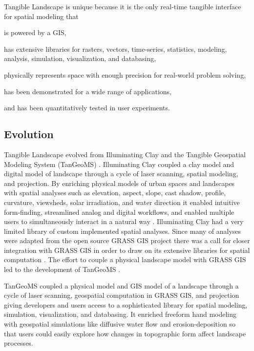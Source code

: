 \documentclass[prodmode,acmtochi]{acmsmall} %
\begin{document}
Tangible Landscape is unique because it is the only 
real-time tangible interface for spatial modeling that 
\begin{enumerate*}
\item is powered by a GIS,
\item has extensive libraries for rasters, vectors, time-series, statistics, modeling, analysis, simulation, visualization, and databasing, 
\item physically represents space with enough precision for real-world problem solving,
\item has been demonstrated for a wide range of applications,
\item and has been quantitatively tested in user experiments. 
\end{enumerate*}

\subsection{Evolution}
Tangible Landscape evolved from 
Illuminating Clay \cite{Piper2002a} and 
the Tangible Geospatial Modeling System (TanGeoMS) \cite{Tateosian2010}. 
Illuminating Clay coupled a clay model and digital model of landscape 
through a cycle of laser scanning, spatial modeling, and projection.
By enriching physical models of urban spaces and landscapes 
with spatial analyses  
such as 
elevation, aspect, slope, cast shadow, profile, curvature, 
viewsheds, solar irradiation, and water direction
it enabled
intuitive form-finding, 
streamlined analog and digital workflows, 
and enabled multiple users to simultaneously interact in a natural way \cite{Ratti2004}. 
Illuminating Clay had a very limited library of custom implemented spatial analyses. 
Since many of analyses were adapted 
from the open source GRASS GIS project \cite{Piper2002a} 
there was a call for closer integration with GRASS GIS 
in order to draw on its extensive libraries 
for spatial computation \cite{Piper2002b}. 
The effort to couple a physical landscape model with GRASS GIS \cite{Mitasova2006} 
led to the development of 
TanGeoMS \cite{Tateosian2010}.

TanGeoMS coupled a physical model and GIS model of a landscape 
through a cycle of laser scanning, 
geospatial computation in GRASS GIS, and projection
giving developers and users access to 
a sophisticated library for 
spatial modeling, simulation, visualization, and databasing.
It enriched freeform hand modeling with geospatial simulations 
like diffusive water flow and erosion-deposition 
so that users could easily explore how 
changes in topographic form affect landscape processes. 
\end{document}
